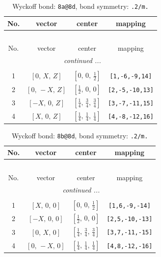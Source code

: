 \documentclass[fleqn,8pt]{jsarticle}
\begin{document}
\begin{longtable}{cccc}
\caption{Wyckoff bond: {\tt 8a@8d}, bond symmetry: {\tt .2/m.}}
 \\
 \hline \hline
No. & vector & center & mapping \\ \hline \endfirsthead

\multicolumn{3}{l}{\tablename\ \thetable{}} \\
 \hline \hline
No. & vector & center & mapping \\ \hline \endhead

 \hline \hline
\multicolumn{3}{r}{\footnotesize\it continued ...} \\ \endfoot

 \hline \hline
\multicolumn{3}{r}{} \\ \endlastfoot

1 & $\left[ 0,\, X,\, Z \right]$ & $\left[ 0,\, 0,\, \frac{1}{2} \right]$ & {\tt [1,-6,-9,14]} \\ \hline
2 & $\left[ 0,\, - X,\, Z \right]$ & $\left[ \frac{1}{2},\, 0,\, 0 \right]$ & {\tt [2,-5,-10,13]} \\ \hline
3 & $\left[ - X,\, 0,\, Z \right]$ & $\left[ \frac{1}{4},\, \frac{3}{4},\, \frac{3}{4} \right]$ & {\tt [3,-7,-11,15]} \\ \hline
4 & $\left[ X,\, 0,\, Z \right]$ & $\left[ \frac{1}{4},\, \frac{1}{4},\, \frac{1}{4} \right]$ & {\tt [4,-8,-12,16]} \\
\end{longtable}
\renewcommand{\arraystretch}{1.2}
\begin{longtable}{cccc}
\caption{Wyckoff bond: {\tt 8b@8d}, bond symmetry: {\tt .2/m.}}
 \\
 \hline \hline
No. & vector & center & mapping \\ \hline \endfirsthead

\multicolumn{3}{l}{\tablename\ \thetable{}} \\
 \hline \hline
No. & vector & center & mapping \\ \hline \endhead

 \hline \hline
\multicolumn{3}{r}{\footnotesize\it continued ...} \\ \endfoot

 \hline \hline
\multicolumn{3}{r}{} \\ \endlastfoot

1 & $\left[ X,\, 0,\, 0 \right]$ & $\left[ 0,\, 0,\, \frac{1}{2} \right]$ & {\tt [1,6,-9,-14]} \\ \hline
2 & $\left[ - X,\, 0,\, 0 \right]$ & $\left[ \frac{1}{2},\, 0,\, 0 \right]$ & {\tt [2,5,-10,-13]} \\ \hline
3 & $\left[ 0,\, X,\, 0 \right]$ & $\left[ \frac{1}{4},\, \frac{3}{4},\, \frac{3}{4} \right]$ & {\tt [3,7,-11,-15]} \\ \hline
4 & $\left[ 0,\, - X,\, 0 \right]$ & $\left[ \frac{1}{4},\, \frac{1}{4},\, \frac{1}{4} \right]$ & {\tt [4,8,-12,-16]} \\
\end{longtable}
\end{document}
